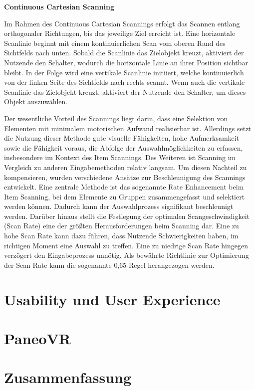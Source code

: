 {\normalfont \bfseries Continuous Cartesian Scanning}

Im Rahmen des Continuous Cartesian Scannings erfolgt das Scannen entlang orthogonaler Richtungen, bis das jeweilige Ziel erreicht ist. Eine horizontale Scanlinie beginnt mit einem kontinuierlichen Scan vom oberen Rand des Sichtfelds nach unten.  
Sobald die Scanlinie das Zielobjekt kreuzt, aktiviert der Nutzende den Schalter, wodurch die horizontale Linie an ihrer Position sichtbar bleibt. In der Folge wird eine vertikale Scanlinie initiiert, welche kontinuierlich von der linken Seite des Sichtfelds nach rechts scannt. Wenn auch die vertikale Scanlinie das Zielobjekt kreuzt, aktiviert der Nutzende den Schalter, um dieses Objekt auszuwählen.

Der wesentliche Vorteil des Scannings liegt darin, dass eine Selektion von Elementen mit minimalem motorischen Aufwand realisierbar ist. Allerdings setzt die Nutzung dieser Methode gute visuelle Fähigkeiten, hohe Aufmerksamkeit sowie die Fähigkeit voraus, die Abfolge der Auswahlmöglichkeiten zu erfassen, insbesondere im Kontext des Item Scannings. Des Weiteren ist Scanning im Vergleich zu anderen Eingabemethoden relativ langsam. Um diesen Nachteil zu kompensieren, wurden verschiedene Ansätze zur Beschleunigung des Scannings entwickelt. Eine zentrale Methode ist das sogenannte Rate Enhancement beim Item Scanning, bei dem Elemente zu Gruppen zusammengefasst und selektiert werden können. Dadurch kann der Auswahlprozess signifikant beschleunigt werden. 
Darüber hinaus stellt die Festlegung der optimalen Scangeschwindigkeit (Scan Rate) eine der größten Herausforderungen beim Scanning dar. Eine zu hohe Scan Rate kann dazu führen, dass Nutzende Schwierigkeiten haben, im richtigen Moment eine Auswahl zu treffen. Eine zu niedrige Scan Rate hingegen verzögert den Eingabeprozess unnötig. Als bewährte Richtlinie zur Optimierung der Scan Rate kann die sogenannte 0,65-Regel herangezogen werden. 

\section{Usability und User Experience}

\section{PaneoVR}

\section{Zusammenfassung} 

